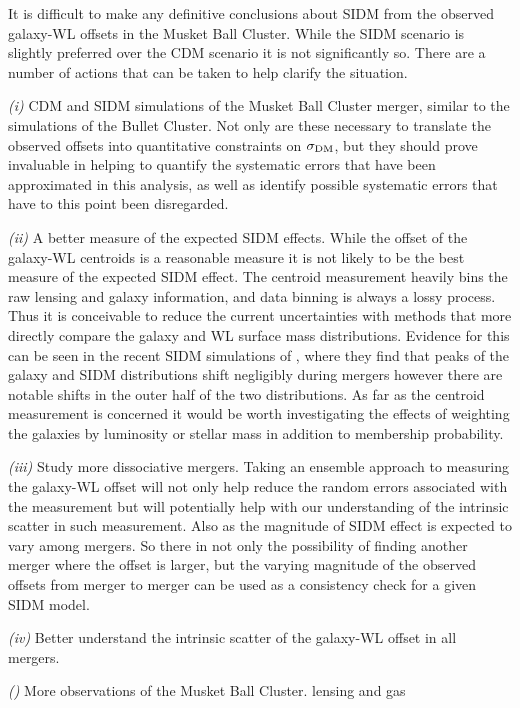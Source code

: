It is difficult to make any definitive conclusions about SIDM from the observed galaxy-WL offsets in the Musket Ball Cluster.
While the SIDM scenario is slightly preferred over the CDM scenario it is not significantly so.
There are a number of actions that can be taken to help clarify the situation.

\textit{(i)} CDM and SIDM simulations of the Musket Ball Cluster merger, similar to the \citet{Randall:2008hs} simulations of the Bullet Cluster.
Not only are these necessary to translate the observed offsets into quantitative constraints on $\sigma_{\rm DM}$, but they should prove invaluable in helping to quantify the systematic errors that have been approximated in this analysis, as well as identify possible systematic errors that have to this point been disregarded.

\textit{(ii)} A better measure of the expected SIDM effects.
While the offset of the galaxy-WL centroids is a reasonable measure it is not likely to be the best measure of the expected SIDM effect.
The centroid measurement heavily bins the raw lensing and galaxy information, and data binning is always a lossy process.
Thus it is conceivable to reduce the current uncertainties with methods that more directly compare the galaxy and WL surface mass distributions.
Evidence for this can be seen in the recent SIDM simulations of \citet{Kahlhoefer:2013wp}, where they find that peaks of the galaxy and SIDM distributions shift  negligibly during mergers however there are notable shifts in the outer half of the  two distributions.
As far as the centroid measurement is concerned it would be worth investigating the effects of weighting the galaxies by luminosity or stellar mass in addition to membership probability.

\textit{(iii)} Study more dissociative mergers.
Taking an ensemble approach to measuring the galaxy-WL offset will not only help reduce the random errors associated with the measurement but will potentially help with our understanding of the intrinsic scatter in such measurement.
Also as \citet{Kahlhoefer:2013wp} the magnitude of SIDM effect is expected to vary among mergers.
So there in not only the possibility of finding another merger where the offset is larger, but the varying magnitude of the observed offsets from merger to merger can be used as a consistency check for a given SIDM model.

\textit{(iv)} Better understand the intrinsic scatter of the galaxy-WL offset in all mergers.

\textit{()} More observations of the Musket Ball Cluster.
lensing and gas


